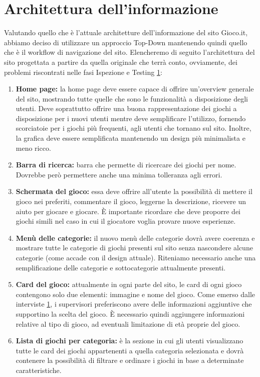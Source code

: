 \documentclass[../Report.tex]{subfiles}
\begin{document}
    \section{Architettura dell'informazione}
    Valutando quello che è l'attuale architetture dell'informazione del sito Gioco.it, abbiamo deciso di utilizzare un approccio Top-Down mantenendo quindi quello che è il workflow di navigazione del sito. Elencheremo di seguito l'architettura del sito progettata a partire da quella originale che terrà conto, ovviamente, dei problemi riscontrati nelle fasi Ispezione e Testing \ref{}:
    \begin{enumerate}
        \item \textbf{Home page:} la home page deve essere capace di offrire un'overview generale del sito, mostrando tutte quelle che sono le funzionalità a disposizione degli utenti. Deve soprattutto offrire una buona rappresentazione dei giochi a disposizione per i nuovi utenti mentre deve semplificare l'utilizzo, fornendo scorciatoie per i giochi più frequenti, agli utenti che tornano sul sito. Inoltre, la grafica deve essere semplificata mantenendo un design più minimalista e meno ricco.
        \item \textbf{Barra di ricerca:} barra che permette di ricercare dei giochi per nome. Dovrebbe però permettere anche una minima tolleranza agli errori.
        \item \textbf{Schermata del gioco:} essa deve offrire all'utente la possibilità di mettere il gioco nei preferiti, commentare il gioco, leggerne la descrizione, ricevere un aiuto per giocare e giocare. È importante ricordare che deve proporre dei giochi simili nel caso in cui il giocatore voglia provare nuove esperienze.
        \item \textbf{Menù delle categorie:} il nuovo menù delle categorie dovrà avere coerenza e mostrare tutte le categorie di giochi presenti sul sito senza nascondere alcune categorie (come accade con il design attuale). Riteniamo necessario anche una semplificazione delle categorie e sottocategorie attualmente presenti.
        \item \textbf{Card del gioco:} attualmente in ogni parte del sito, le card di ogni gioco contengono solo due elementi: immagine e nome del gioco. Come emerso dalle interviste \ref{}, i supervisori preferiscono avere delle informazioni aggiuntive che supportino la scelta del gioco. È necessario quindi aggiungere informazioni relative al tipo di gioco, ad eventuali limitazione di età proprie del gioco.
        \item \textbf{Lista di giochi per categoria:} è la sezione in cui gli utenti visualizzano tutte le card dei giochi appartenenti a quella categoria selezionata e dovrà contenere la possibilità di filtrare e ordinare i giochi in base a determinate caratteristiche.

\end{enumerate}
\end{document}

